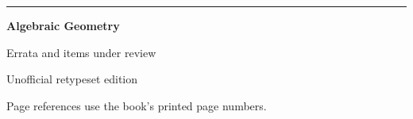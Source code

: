 \documentclass[10pt]{article}
\begin{document}
\vspace*{23pt}
\hrule\vspace{8pt}
{\Large\bfseries Algebraic Geometry}\par
{\large Errata and items under review}\par
{\small Unofficial retypeset edition}
\vspace{12pt}

Page references use the book's printed page numbers.








\end{document}

